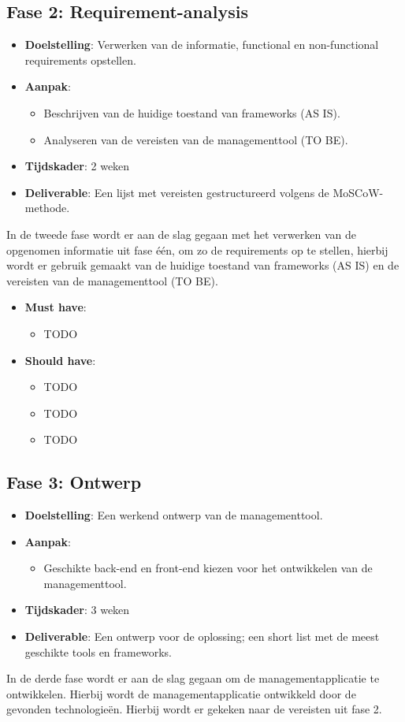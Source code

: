 \documentclass{hogent-article}
\begin{document}
\subsection*{Fase 2: Requirement-analysis}
\begin{itemize}
\item \textbf{Doelstelling}: Verwerken van de informatie, functional en non-functional requirements opstellen.
\item \textbf{Aanpak}:
\begin{itemize}
\item Beschrijven van de huidige toestand van frameworks (AS IS).
\item Analyseren van de vereisten van de managementtool (TO BE).
\end{itemize}
\item \textbf{Tijdskader}: 2 weken
\item \textbf{Deliverable}: Een lijst met vereisten gestructureerd volgens de MoSCoW-methode.
\end{itemize}
\bigskip
In de tweede fase wordt er aan de slag gegaan met het verwerken van de opgenomen informatie uit fase \'{e}\'{e}n, om zo de requirements op te stellen, hierbij wordt er gebruik gemaakt van de huidige toestand van frameworks (AS IS) en de vereisten van de managementtool (TO BE).
\begin{itemize}
\item \textbf{Must have}:
\begin{itemize}
\item TODO
\end{itemize}

\item \textbf{Should have}:
\begin{itemize}
  \item TODO
  \item TODO
  \item TODO

\end{itemize}
\end{itemize}
\bigskip
\subsection*{Fase 3: Ontwerp}
\begin{itemize}
\item \textbf{Doelstelling}: Een werkend ontwerp van de managementtool.
\item \textbf{Aanpak}:
\begin{itemize}
\item Geschikte back-end en front-end kiezen voor het ontwikkelen van de managementtool.
\end{itemize}
\item \textbf{Tijdskader}: 3 weken
\item \textbf{Deliverable}: Een ontwerp voor de oplossing; een short list met de meest geschikte tools en frameworks.
\end{itemize}
\bigskip
In de derde fase wordt er aan de slag gegaan om de managementapplicatie te ontwikkelen. Hierbij wordt de managementapplicatie ontwikkeld door de gevonden technologieën. Hierbij wordt er gekeken naar de vereisten uit fase 2.
\bigbreak
\end{document}
